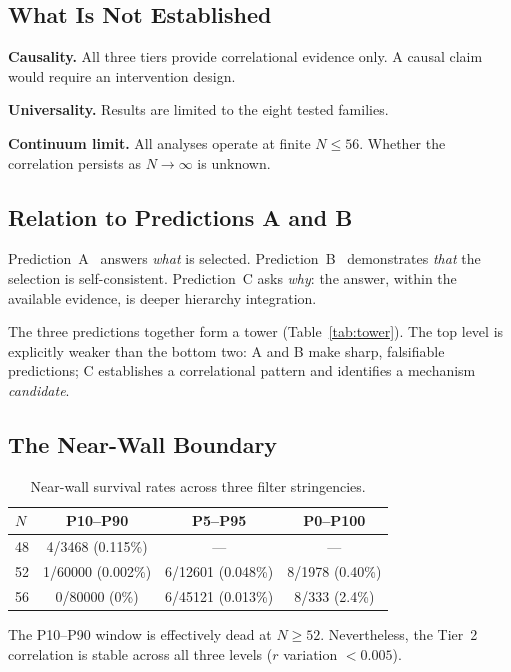 \documentclass[entropy,article,submit,pdftex,moreauthors]{Definitions/mdpi}
\begin{document}
\subsection{What Is Not Established}

\textbf{Causality.} All three tiers provide correlational evidence only. A causal claim would require an intervention design.

\textbf{Universality.} Results are limited to the eight tested families.

\textbf{Continuum limit.} All analyses operate at finite $N \leq 56$. Whether the correlation persists as $N \to \infty$ is unknown.

\subsection{Relation to Predictions A and B}

Prediction~A~\cite{zhang2026predA} answers \emph{what} is selected. Prediction~B~\cite{zhang2026predB} demonstrates \emph{that} the selection is self-consistent. Prediction~C asks \emph{why}: the answer, within the available evidence, is deeper hierarchy integration.

The three predictions together form a tower (Table~\ref{tab:tower}). The top level is explicitly weaker than the bottom two: A and B make sharp, falsifiable predictions; C establishes a correlational pattern and identifies a mechanism \emph{candidate}.

\subsection{The Near-Wall Boundary}

\begin{table}[H]
\caption{Near-wall survival rates across three filter stringencies.\label{tab:nearwall}}
\begin{tabular}{lccc}
\toprule
\boldmath$N$ & \textbf{P10--P90} & \textbf{P5--P95} & \textbf{P0--P100} \\
\midrule
48 & 4/3468 (0.115\%) & --- & --- \\
52 & 1/60000 (0.002\%) & 6/12601 (0.048\%) & 8/1978 (0.40\%) \\
56 & 0/80000 (0\%) & 6/45121 (0.013\%) & 8/333 (2.4\%) \\
\bottomrule
\end{tabular}
\end{table}

The P10--P90 window is effectively dead at $N \geq 52$. Nevertheless, the Tier~2 correlation is stable across all three levels ($r$ variation $< 0.005$).
\end{document}
